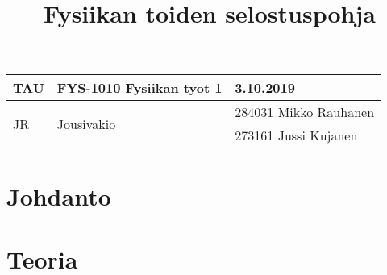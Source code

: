 \documentclass[a4paper, 12pt]{article}
\title{Fysiikan toiden selostuspohja}
\begin{document}
\thispagestyle{empty}

\begin{tabular}{|p{2.0cm}|p{5.0cm}|p{5cm}|}
\hline 
TAU  &  FYS-1010 Fysiikan tyot 1      &  3.10.2019\\
\hline  
\multirow{2}{*}{JR}   &\multirow{2}{*}{Jousivakio}     &  284031 Mikko Rauhanen \\ &&  273161 Jussi Kujanen\\
\hline
\end{tabular}

\newpage
\thispagestyle{empty}
\tableofcontents

\newpage
\clearpage
{} 

\section{Johdanto}



\section{Teoria}



\subsection{}

  

        
        \begin{equation}\label{kaava 1}
        
        \end{equation}
        

        
        \begin{equation}\label{kaava 2}
        
        \end{equation}
        


    \subsection{}
    

        
        \begin{equation}\label{kaava 3}
        
        \end{equation}
        
\end{document}
